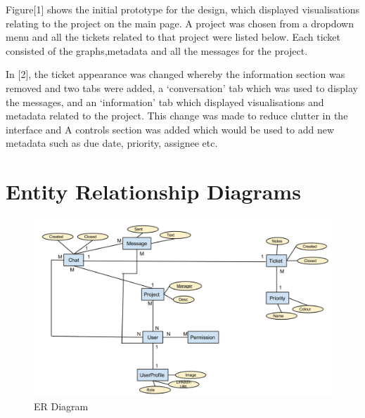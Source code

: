 \documentclass[a4paper]{l3proj}
\begin{document}
Figure[1] shows the initial prototype for the design, which displayed visualisations relating to the project on the main page.  A project was chosen from a dropdown menu and all the tickets related to that project were listed below.  Each ticket consisted of the graphs,metadata and all the messages for the project.

In [2], the ticket appearance was changed whereby the information section was removed and two tabs were added, a ‘conversation’ tab which was used to display the messages, and an ‘information’ tab which displayed visualisations and metadata related to the project. This change was made to reduce clutter in the interface and  A controls section was added which would be used to add new metadata such as due date, priority, assignee etc.






\section{Entity Relationship Diagrams}

\begin{figure}
\includegraphics[scale=0.4]{ER_Diagram}
\caption{ER Diagram}
\end{figure}
\end{document}
